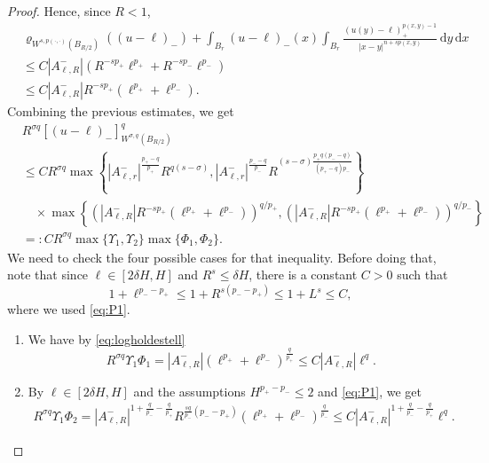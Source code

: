 \documentclass[11pt]{amsart}
\theoremstyle{plain}
\theoremstyle{definition}
\numberwithin{equation}{section}
\begin{document}
\begin{proof}
Hence, since $R<1$,
\begin{equation} \label{eq:modular}
\begin{split}
&\varrho_{W^{s,p(\cdot,\cdot)}(B_{R/2})}((u-\ell)_-) + \int_{B_r} (u-\ell)_-(x) \int_{B_r} \frac{(u(y)-\ell)_+^{p(x,y)-1}}{|x-y|^{n+sp(x,y)}} \,\mathrm{d}y \,\mathrm{d}x \\
&\leq C |A_{\ell,R}^{-}| \left(R^{-sp_{+}}\ell^{p_{+}} + R^{-sp_{-}}\ell^{p_{-}}\right)\\
&\leq C |A_{\ell,R}^{-}| R^{-sp_{+}}\left(\ell^{p_{+}} + \ell^{p_{-}}\right).
\end{split}
\end{equation}
Combining the previous estimates, we get 
\begin{align*}
 & R^{\sigma q}[(u-\ell)_{-}]_{W^{\sigma,q}(B_{R/2})}^q \\
 & \leq C R^{\sigma q} \max \left\lbrace  |A_{\ell,r}^{-}|^{\frac{p_+-q}{p_+}} R^{q(s-\sigma)} ,  |A_{\ell,r}^{-}|^{\frac{p_--q}{p_-}} R^{(s-\sigma) \frac{p_+ q(p_--q)}{(p_+-q)p_-}} \right \rbrace \\
 & \quad \times \max\left\{ \left( |A_{\ell,R}^{-}| R^{-sp_{+}}\left(\ell^{p_{+}} + \ell^{p_{-}}\right)\right)^{q/p_{+}}, \left( |A_{\ell,R}^{-}| R^{-sp_{+}}\left(\ell^{p_{+}} + \ell^{p_{-}}\right)\right)^{q/p_{-}}\right\} \\
 & =:CR^{\sigma q}\max\{\Upsilon_1,\Upsilon_2\}\max\{\Phi_1,\Phi_2\}.
\end{align*}
We need to check the four possible cases for that inequality. Before doing that, 
note that since $\ell\in[2\delta H,  H]$ and $R^s\leq \delta H$, there is a constant $C>0$ such that
\begin{equation}\label{eq:logholdestell}
1+\ell^{p_{-}-p_{+}} \leq 1+R^{s(p_{-}-p_{+})} \leq 1+L^s \leq C,
\end{equation}
where we used \eqref{eq:P1}.
\begin{enumerate}
\item We have by \eqref{eq:logholdestell}
\[ R^{\sigma q}\Upsilon_1 \Phi_1 =  |A_{\ell, R}^{-}| \left(\ell^{p_{+}}+\ell^{p_{-}}\right)^{\frac{q}{p_{+}}} \leq C |A_{\ell, R}^{-}| \ell^q.\]
\item By $\ell\in[2\delta H,  H]$ and the assumptions $H^{p_{+}-p_-}\leq 2$ and \eqref{eq:P1}, we get
\begin{align*}
 R^{\sigma q}\Upsilon_1 \Phi_2= |A_{\ell, R}^{-}|^{1+ \frac{q}{p_{-}} - \frac{q}{p_{+}}} R^{\frac{sq}{p_{-}}(p_{-}-p_{+})} \left(\ell^{p_{+}}+\ell^{p_{-}}\right)^{\frac{q}{p_{-}}} \leq C|A_{\ell, R}^{-}|^{1+ \frac{q}{p_{-}} - \frac{q}{p_{+}}} \ell^q.

\end{align*}
\end{enumerate}
\end{proof}
\end{document}

